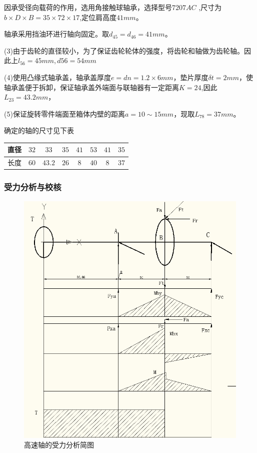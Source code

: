 因承受径向载荷的作用，选用角接触球轴承，选择型号$7207AC$ ,尺寸为$b\times D \times B=35\times 72 \times 17$,定位肩高度$41mm$。

轴承采用挡油环进行轴向固定。取$d_{45}=d_{46}=41mm$。

(3)由于齿轮的直径较小，为了保证齿轮轮体的强度，将齿轮和轴做为齿轮轴。因此上$l_{56}=45mm,d{56}=54mm$

(4)使用凸缘式轴承盖，轴承盖厚度$e=dn=1.2\times 6mm$，垫片厚度$\delta t=2mm$，使轴承盖便于拆卸，保证轴承盖外端面与联轴器有一定距离$K=24$,因此$L_{23}=43.2mm$，

(5)保证旋转零件端面至箱体内壁的距离$a=10\sim 15mm$，现取$L_{78}=37mm$。

确定的轴的尺寸见下表

\begin{tabular}{|c|c|c|c|c|c|c|c|}
    \hline
    直径& $32$&$33$&$35$&$41$&$53$&$41$&$35$\\
    \hline
    长度&$60$&$43.2$&$26$&$8$&$40$&$8$&$37$\\
    \hline
\end{tabular}

\subsubsection{受力分析与校核}
\begin{figure}[h]
    \centering
    \includegraphics[scale=0.7]{graphic/5-2.png}
    \caption{高速轴的受力分析简图}
    \label{img1}
\end{figure}

